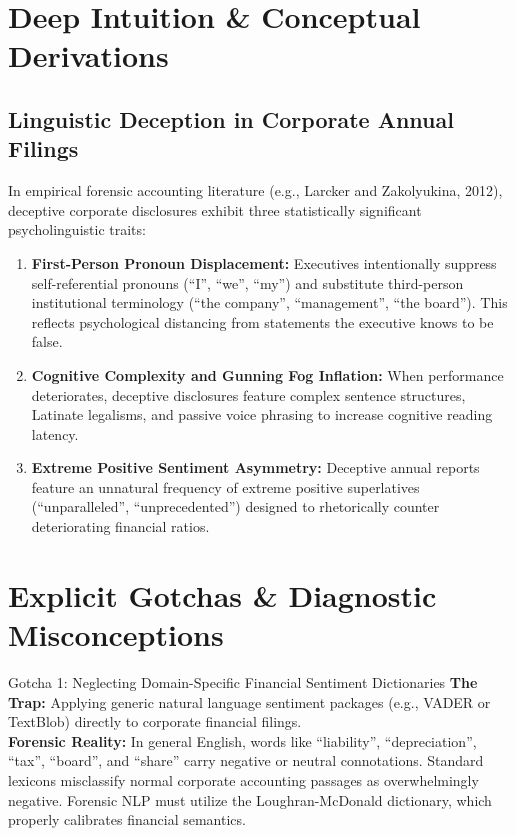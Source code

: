 \section{Deep Intuition \& Conceptual Derivations}

\subsection{Linguistic Deception in Corporate Annual Filings}
In empirical forensic accounting literature (e.g., Larcker and Zakolyukina, 2012), deceptive corporate disclosures exhibit three statistically significant psycholinguistic traits:
\begin{enumerate}
    \item \textbf{First-Person Pronoun Displacement:} Executives intentionally suppress self-referential pronouns (``I'', ``we'', ``my'') and substitute third-person institutional terminology (``the company'', ``management'', ``the board''). This reflects psychological distancing from statements the executive knows to be false.
    \item \textbf{Cognitive Complexity and Gunning Fog Inflation:} When performance deteriorates, deceptive disclosures feature complex sentence structures, Latinate legalisms, and passive voice phrasing to increase cognitive reading latency.
    \item \textbf{Extreme Positive Sentiment Asymmetry:} Deceptive annual reports feature an unnatural frequency of extreme positive superlatives (``unparalleled'', ``unprecedented'') designed to rhetorically counter deteriorating financial ratios.
\end{enumerate}

\section{Explicit Gotchas \& Diagnostic Misconceptions}

\begin{trapbox}{Gotcha 1: Neglecting Domain-Specific Financial Sentiment Dictionaries}
\textbf{The Trap:} Applying generic natural language sentiment packages (e.g., VADER or TextBlob) directly to corporate financial filings.\\
\textbf{Forensic Reality:} In general English, words like ``liability'', ``depreciation'', ``tax'', ``board'', and ``share'' carry negative or neutral connotations. Standard lexicons misclassify normal corporate accounting passages as overwhelmingly negative. Forensic NLP must utilize the Loughran-McDonald dictionary, which properly calibrates financial semantics.
\end{trapbox}


